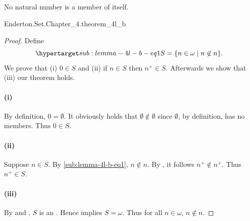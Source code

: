 \documentclass{report}
\begin{document}
\subsection{}%

  \begin{lemma}[4L(b)]
    No natural number is a member of itself.
  \end{lemma}

    {Enderton.Set.Chapter\_4.theorem\_4l\_b}


  \begin{proof}

    Define
      \begin{equation}
        \hyperlabel{sub:lemma-4l-b-eq1}
        S = \{n \in \omega \mid n \not\in n\}.
      \end{equation}
    We prove that (i) $0 \in S$ and (ii) if $n \in S$ then $n^+ \in S$.
    Afterwards we show that (iii) our theorem holds.

    \paragraph{(i)}%

      By definition, $0 = \emptyset$.
      It obviously holds that $\emptyset \not\in \emptyset$ since $\emptyset$,
        by definition, has no members.
      Thus $0 \in S$.

    \paragraph{(ii)}%

      Suppose $n \in S$.
      By \eqref{sub:lemma-4l-b-eq1}, $n \not\in n$.
      By , it follows $n^+ \not\in n^+$.
      Thus $n^+ \in S$.

    \paragraph{(iii)}%

      By  and , $S$ is an
        .
      Hence  implies $S = \omega$.
      Thus for all $n \in \omega$, $n \not\in n$.

  \end{proof}
\end{document}
